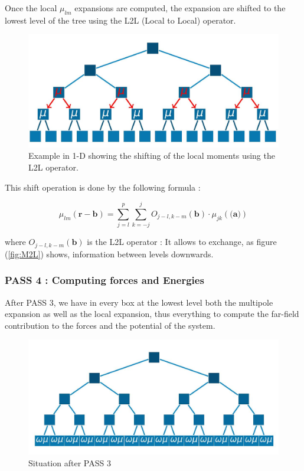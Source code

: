 \documentclass[12pt,twoside,a4paper]{report}
\begin{document}
Once the local $\mu_{lm}$ expansions are computed, the expansion are shifted to the lowest level of the tree using the L2L (Local to Local) operator.

	\begin{figure}[H]
	\label{fig:L2L}
   \includegraphics[scale=0.4]{L2L_1}
    \centering 
    \caption{Example in 1-D showing the shifting of the local moments using the L2L operator. }
    
   \end{figure}
    
 	This shift operation is done by the following formula :
 	
 	  \begin{equation}
	  \mu_{lm}(\textbf{r} - \textbf{b}) = \sum\limits_{j = l}^{p} \sum\limits_{k=-j}^{j}
	  O_{j-l,k-m}(\textbf{b}) \cdot \mu_{jk}(\textbf{(a)})
	  \end{equation}
 
 		where $O_{j-l,k-m}(\textbf{b})$ is the L2L operator : It allows to exchange, as figure (\ref{fig:M2L}) shows, information between levels downwards.
 		
 \subsubsection{PASS 4 : Computing forces and Energies}
 
 
 After PASS 3, we have in every box at the lowest level both the multipole expansion as well as the local expansion, thus everything to compute the far-field contribution to the forces and the potential of the system. 
 
\begin{figure}[H]
	\label{fig:farfield}
   \includegraphics[scale=0.5]{farfield}
    \centering 
    \caption{Situation after PASS 3 }
    
   \end{figure} 
   
\end{document}
